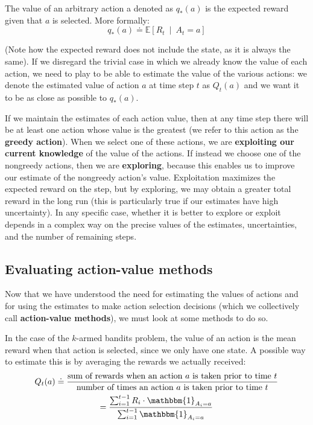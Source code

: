 The value of an arbitrary action a denoted as $q_*(a)$ is the expected reward given that $a$ is selected. More formally:
\begin{equation*}
    q_*(a) \doteq \mathbb{E} \left[ R_t \  \middle\vert \  A_t = a \right]
\end{equation*}

(Note how the expected reward does not include the state, as it is always the same). If we disregard the trivial case in which we already know the value of each action, we need to play to be able to estimate the value of the various actions: we denote the estimated value of action $a$ at time step $t$ as $Q_t(a)$ and we want it to be as close as possible to $q_*(a)$.

If we maintain the estimates of each action value, then at any time step there will be at least one action whose value is the greatest (we refer to this action as the \textbf{greedy action}). When we select one of these actions, we are \textbf{exploiting our current knowledge} of the value of the actions. If instead we choose one of the nongreedy actions, then we are \textbf{exploring}, because this enables us to improve our estimate of the nongreedy action’s value. Exploitation maximizes the expected reward on the step, but by exploring, we may obtain a greater total reward in the long run (this is particularly true if our estimates have high uncertainty). In any specific case, whether it is better to explore or exploit depends in a complex way on the precise values of the estimates, uncertainties, and the number of remaining steps.

\subsection{Evaluating action-value methods}
Now that we have understood the need for estimating the values of actions and for using the estimates to make action selection decisions (which we collectively call \textbf{action-value methods}), we must look at some methods to do so.

In the case of the $k$-armed bandits problem, the value of an action is the mean reward when that action is selected, since we only have one state. A possible way to estimate this is by averaging the rewards we actually received:
\begin{gather}
    Q_t(a) \doteq \frac{\text{sum of rewards when an action } a \text{ is taken prior to time } t}{\text{number of times an action } a \text{ is taken prior to time } t}\nonumber\\
    = \frac{\sum_{i=1}^{t-1} R_i \cdot \mathbbm{1}_{A_i = a}}{\sum_{i=1}^{t-1} \mathbbm{1}_{A_i = a}}
    \label{eq:ch3-sampleaveragemethod}
\end{gather}

